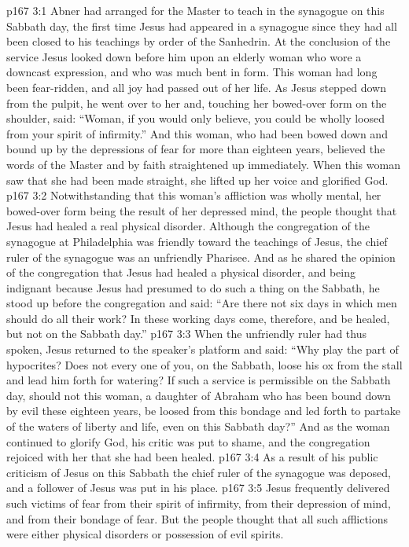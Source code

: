 \vs p167 3:1 Abner had arranged for the Master to teach in the synagogue on this Sabbath day, the first time Jesus had appeared in a synagogue since they had all been closed to his teachings by order of the Sanhedrin. At the conclusion of the service Jesus looked down before him upon an elderly woman who wore a downcast expression, and who was much bent in form. This woman had long been fear\hyp{}ridden, and all joy had passed out of her life. As Jesus stepped down from the pulpit, he went over to her and, touching her bowed\hyp{}over form on the shoulder, said: \textcolor{ubdarkred}{“Woman, if you would only believe, you could be wholly loosed from your spirit of infirmity.”} And this woman, who had been bowed down and bound up by the depressions of fear for more than eighteen years, believed the words of the Master and by faith straightened up immediately. When this woman saw that she had been made straight, she lifted up her voice and glorified God.
\vs p167 3:2 Notwithstanding that this woman’s affliction was wholly mental, her bowed\hyp{}over form being the result of her depressed mind, the people thought that Jesus had healed a real physical disorder. Although the congregation of the synagogue at Philadelphia was friendly toward the teachings of Jesus, the chief ruler of the synagogue was an unfriendly Pharisee. And as he shared the opinion of the congregation that Jesus had healed a physical disorder, and being indignant because Jesus had presumed to do such a thing on the Sabbath, he stood up before the congregation and said: “Are there not six days in which men should do all their work? In these working days come, therefore, and be healed, but not on the Sabbath day.”\plusone
\vs p167 3:3 When the unfriendly ruler had thus spoken, Jesus returned to the speaker’s platform and said: \textcolor{ubdarkred}{“Why play the part of hypocrites? Does not every one of you, on the Sabbath, loose his ox from the stall and lead him forth for watering? If such a service is permissible on the Sabbath day, should not this woman, a daughter of Abraham who has been bound down by evil these eighteen years, be loosed from this bondage and led forth to partake of the waters of liberty and life, even on this Sabbath day?”} And as the woman continued to glorify God, his critic was put to shame, and the congregation rejoiced with her that she had been healed.
\vs p167 3:4 As a result of his public criticism of Jesus on this Sabbath the chief ruler of the synagogue was deposed, and a follower of Jesus was put in his place.
\pc \vs p167 3:5 Jesus frequently delivered such victims of fear from their spirit of infirmity, from their depression of mind, and from their bondage of fear. But the people thought that all such afflictions were either physical disorders or possession of evil spirits.
